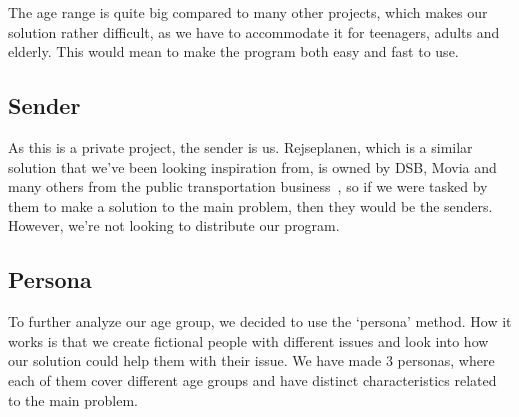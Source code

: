 The age range is quite big compared to many other projects, which makes our solution rather difficult, as we have to
accommodate it for teenagers, adults and elderly.
This would mean to make the program both easy and fast to use.

\subsection{Sender}\label{subsec:sender} %

As this is a private project, the sender is us.
Rejseplanen, which is a similar solution that we've been looking inspiration from, is owned by DSB, Movia and many
others from the public transportation business~\cite{om_rejseplanen}, so if we were tasked by them to make a solution to
the main problem, then they would be the senders.
However, we're not looking to distribute our program.

\subsection{Persona}\label{subsec:persona}

To further analyze our age group, we decided to use the `persona' method.
How it works is that we create fictional people with different issues and look into how our solution could help them
with their issue.
We have made 3 personas, where each of them cover different age groups and have distinct characteristics related to the
main problem.


